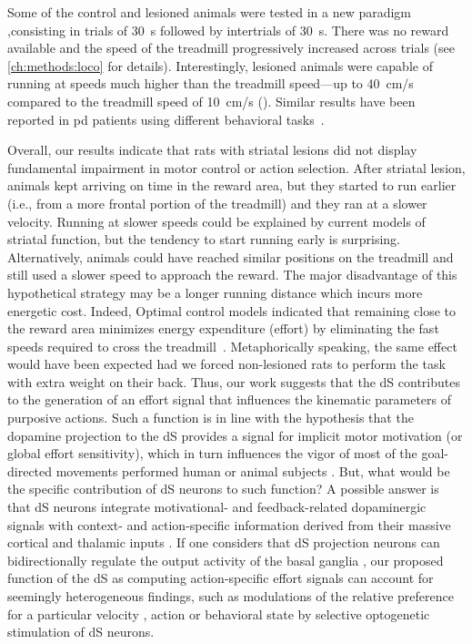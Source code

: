 Some of the control and lesioned animals were tested in a new paradigm ,consisting in trials of 30~s followed by intertrials of 30~s.
There was no reward available and the speed of the treadmill progressively increased across trials (see \autoref{ch:methods:loco} for details).
Interestingly, lesioned animals were capable of running at speeds much higher than the treadmill speed---up to 40~cm/s compared to the treadmill speed of 10~cm/s ().
Similar results have been reported in \gls{pd} patients using different behavioral tasks~\cite{Mazzoni2007, Schmidt2008Brain}.
\par
Overall, our results indicate that rats with striatal lesions did not display fundamental impairment in motor control or action selection.
After striatal lesion, animals kept arriving on time in the reward area, but they started to run earlier (i.e., from a more frontal portion of the treadmill) and they ran at a slower velocity.
Running at slower speeds could be explained by current models of striatal function, but the tendency to start running early is surprising.
Alternatively, animals could have reached similar positions on the treadmill and still used a slower speed to approach the reward.
The major disadvantage of this hypothetical strategy may be a longer running distance which incurs more energetic cost.
Indeed, Optimal control models indicated that remaining close to the reward area minimizes energy expenditure (effort) by eliminating the fast speeds required to cross the treadmill~\cite{JuradoParras2020}.
Metaphorically speaking, the same effect would have been expected had we forced non-lesioned rats to perform the task with extra weight on their back. 
Thus, our work suggests that the dS contributes to the generation of an effort signal that influences the kinematic parameters of purposive actions.
Such a function is in line with the hypothesis that the dopamine projection to the dS provides a signal for implicit motor motivation (or global effort sensitivity), which in turn influences the vigor of most of the goal-directed movements performed human or animal subjects \cite{Mazzoni2007JN, Treadway2012JN, Reppert2018JNPhys}.
But, what would be the specific contribution of dS neurons to such function?
A possible answer is that dS neurons integrate motivational- and feedback-related dopaminergic signals with context- and action-specific information derived from their massive cortical and thalamic inputs  \cite{Hunnicutt2016Elife, Hooks2018NatCom}.
If one considers that dS projection neurons can bidirectionally regulate the output activity of the basal ganglia \cite{Kravitz2010}, our proposed function of the dS as computing action-specific effort signals can account for seemingly heterogeneous findings, such as modulations of the relative preference for a particular velocity \cite{ Yttri2016}, action \cite{Tai2012NN, Kravitz2012NN} or behavioral state \cite{Kravitz2010} by selective optogenetic stimulation of dS neurons.
